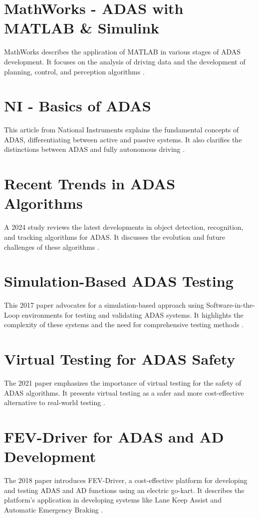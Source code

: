 \documentclass[12pt]{report}
\begin{document}
\section{MathWorks - ADAS with MATLAB \& Simulink}
MathWorks describes the application of MATLAB in various stages of ADAS development. It focuses on the analysis of driving data and the development of planning, control, and perception algorithms \citep{mathworks2024}.

\section{NI - Basics of ADAS}
This article from National Instruments explains the fundamental concepts of ADAS, differentiating between active and passive systems. It also clarifies the distinctions between ADAS and fully autonomous driving \citep{niADAS2024}.

\section{Recent Trends in ADAS Algorithms}
A 2024 study reviews the latest developments in object detection, recognition, and tracking algorithms for ADAS. It discusses the evolution and future challenges of these algorithms \citep{adasTrends2024}.

\section{Simulation-Based ADAS Testing}
This 2017 paper advocates for a simulation-based approach using Software-in-the-Loop environments for testing and validating ADAS systems. It highlights the complexity of these systems and the need for comprehensive testing methods \citep{simulationTest2024}.

\section{Virtual Testing for ADAS Safety}
The 2021 paper emphasizes the importance of virtual testing for the safety of ADAS algorithms. It presents virtual testing as a safer and more cost-effective alternative to real-world testing \citep{virtualTesting2024}.

\section{FEV-Driver for ADAS and AD Development}
The 2018 paper introduces FEV-Driver, a cost-effective platform for developing and testing ADAS and AD functions using an electric go-kart. It describes the platform's application in developing systems like Lane Keep Assist and Automatic Emergency Braking \citep{fevDriver2024}.
\end{document}
